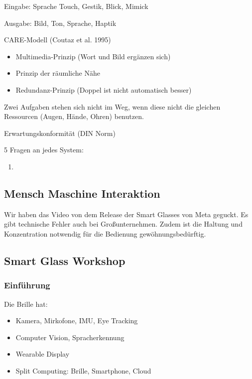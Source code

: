 \documentclass[a4paper]{article}
\begin{document}
Eingabe: Sprache Touch, Gestik, Blick, Mimick

Ausgabe: Bild, Ton, Sprache, Haptik

CARE-Modell (Coutaz et al. 1995)

\begin{itemize}
    \item Multimedia-Prinzip (Wort und Bild ergänzen sich)
    \item Prinzip der räumliche Nähe
    \item Redundanz-Prinzip (Doppel ist nicht automatisch besser)
\end{itemize}

Zwei Aufgaben stehen sich nicht im Weg, wenn diese nicht die gleichen Ressourcen (Augen, Hände, Ohren) benutzen.

Erwartungskonformität (DIN Norm)

5 Fragen an jedes System:


\begin{enumerate}
    \item 
\end{enumerate}

\subsection{Mensch Maschine Interaktion}

Wir haben das Video von dem Release der Smart Glasses von Meta geguckt. Es gibt technische Fehler auch bei Großunternehmen. Zudem ist die Haltung und Konzentration notwendig für die Bedienung gewöhnungsbedürftig.

\subsection{Smart Glass Workshop}

\subsubsection{Einführung}

Die Brille hat:

\begin{itemize}
    \item Kamera, Mirkofone, IMU, Eye Tracking
    \item Computer Vision, Spracherkennung
    \item Wearable Display
    \item Split Computing: Brille, Smartphone, Cloud
\end{itemize}
\end{document}
